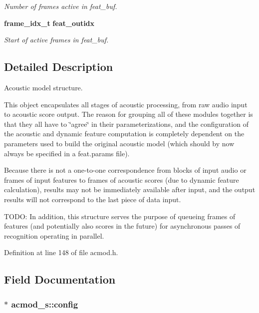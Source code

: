 \begin{DoxyCompactItemize}
\begin{DoxyCompactList}\small\item\em \-Number of frames active in feat\-\_\-buf. \end{DoxyCompactList}\item 
{\bf frame\-\_\-idx\-\_\-t} {\bf feat\-\_\-outidx}\label{structacmod__s_ae15076737bcdcbe1d5b4226f7a0b3f5b}

\begin{DoxyCompactList}\small\item\em \-Start of active frames in feat\-\_\-buf. \end{DoxyCompactList}\end{DoxyCompactItemize}


\subsection{\-Detailed \-Description}
\-Acoustic model structure. 

\-This object encapsulates all stages of acoustic processing, from raw audio input to acoustic score output. \-The reason for grouping all of these modules together is that they all have to \char`\"{}agree\char`\"{} in their parameterizations, and the configuration of the acoustic and dynamic feature computation is completely dependent on the parameters used to build the original acoustic model (which should by now always be specified in a feat.\-params file).

\-Because there is not a one-\/to-\/one correspondence from blocks of input audio or frames of input features to frames of acoustic scores (due to dynamic feature calculation), results may not be immediately available after input, and the output results will not correspond to the last piece of data input.

\-T\-O\-D\-O\-: \-In addition, this structure serves the purpose of queueing frames of features (and potentially also scores in the future) for asynchronous passes of recognition operating in parallel. 

\-Definition at line 148 of file acmod.\-h.



\subsection{\-Field \-Documentation}
\subsubsection[{config}]{$\ast$ {\bf acmod\-\_\-s\-::config}}\label{structacmod__s_a3563f4d0bdc48d3ee140b9e28806279d}


